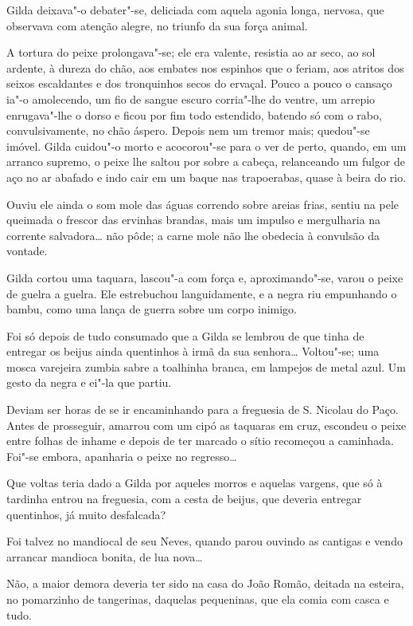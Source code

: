 Gilda deixava"-o debater"-se, deliciada com aquela agonia longa, nervosa,
que observava com atenção alegre, no triunfo da sua força animal.

A tortura do peixe prolongava"-se; ele era valente, resistia ao ar seco,
ao sol ardente, à dureza do chão, aos embates nos espinhos que o feriam,
aos atritos dos seixos escaldantes e dos tronquinhos secos do ervaçal.
Pouco a pouco o cansaço ia"-o amolecendo, um fio de sangue escuro
corria"-lhe do ventre, um arrepio enrugava"-lhe o dorso e ficou por fim
todo estendido, batendo só com o rabo, convulsivamente, no chão áspero.
Depois nem um tremor mais; quedou"-se imóvel. Gilda cuidou"-o morto e
acocorou"-se para o ver de perto, quando, em um arranco supremo, o peixe
lhe saltou por sobre a cabeça, relanceando um fulgor de aço no ar
abafado e indo cair em um baque nas trapoerabas, quase à beira do rio.

Ouviu ele ainda o som mole das águas correndo sobre areias frias, sentiu
na pele queimada o frescor das ervinhas brandas, mais um impulso e
mergulharia na corrente salvadora\ldots{} não pôde; a carne mole não lhe
obedecia à convulsão da vontade.

Gilda cortou uma taquara, lascou"-a com força e, aproximando"-se, varou o
peixe de guelra a guelra. Ele estrebuchou languidamente, e a negra riu
empunhando o bambu, como uma lança de guerra sobre um corpo inimigo.

Foi só depois de tudo consumado que a Gilda se lembrou de que tinha de
entregar os beijus ainda quentinhos à irmã da sua senhora\ldots{} Voltou"-se;
uma mosca varejeira zumbia sabre a toalhinha branca, em lampejos de
metal azul. Um gesto da negra e ei"-la que partiu.

Deviam ser horas de se ir encaminhando para a freguesia de S. Nicolau do
Paço. Antes de prosseguir, amarrou com um cipó as taquaras em cruz,
escondeu o peixe entre folhas de inhame e depois de ter marcado o sítio
recomeçou a caminhada. Foi"-se embora, apanharia o peixe no regresso\ldots{}

Que voltas teria dado a Gilda por aqueles morros e aquelas vargens, que
só à tardinha entrou na freguesia, com a cesta de beijus, que deveria
entregar quentinhos, já muito desfalcada?

Foi talvez no mandiocal de seu Neves, quando parou ouvindo as cantigas e
vendo arrancar mandioca bonita, de lua nova\ldots{}

Não, a maior demora deveria ter sido na casa do João Romão, deitada na
esteira, no pomarzinho de tangerinas, daquelas pequeninas, que ela comia
com casca e tudo.

